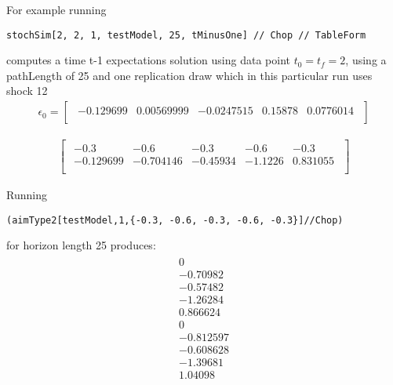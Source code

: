 For example running 


\begin{verbatim}
stochSim[2, 2, 1, testModel, 25, tMinusOne] // Chop // TableForm
\end{verbatim}
computes a time t-1 expectations solution using data point $t_0=t_f=2$, using a pathLength of 25 and one replication draw 
which in this particular run uses
shock {12}
\begin{gather*}\epsilon_0=
  \begin{bmatrix}\begin{array}{ccccc}
 -0.129699 & 0.00569999 & -0.0247515 & 0.15878 & 0.0776014 \\
\end{array}
  \end{bmatrix}
\end{gather*}

\begin{gather*}
  \begin{bmatrix}\begin{array}{ccccc}
 -0.3 & -0.6 & -0.3 & -0.6 & -0.3 \\
 -0.129699 & -0.704146 & -0.45934 & -1.1226 & 0.831055 \\
\end{array}
\end{bmatrix}\end{gather*}

Running 
\begin{verbatim}
(aimType2[testModel,1,{-0.3, -0.6, -0.3, -0.6, -0.3}]//Chop)
\end{verbatim}
for horizon length 25 produces:
{\small
\begin{gather*}\begin{array}{c}
 0 \\
 -0.70982 \\
 -0.57482 \\
 -1.26284 \\
 0.866624 \\
 0 \\
 -0.812597 \\
 -0.608628 \\
 -1.39681 \\
 1.04098 \\
\end{array}
\end{gather*}
}





